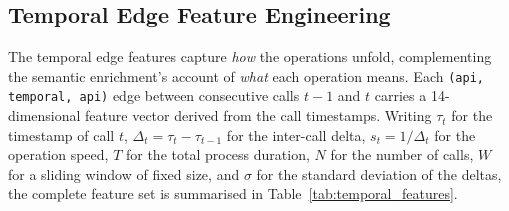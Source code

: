 \documentclass[%
    BCOR=10mm,
    DIV=13,
    toc=bibliography,
    toc=listof,
    oneside,
    12pt,
]{scrbook}
\begin{document}
\subsection{Temporal Edge Feature Engineering}
\label{subsec:temporal_features}

The temporal edge features capture \emph{how} the operations unfold,
complementing the semantic enrichment's account of \emph{what} each operation
means. Each \texttt{(api, temporal, api)} edge between consecutive calls $t-1$
and $t$ carries a 14-dimensional feature vector derived from the call
timestamps. Writing $\tau_t$ for the timestamp of call $t$, $\Delta_t = \tau_t -
\tau_{t-1}$ for the inter-call delta, $s_t = 1/\Delta_t$ for the operation
speed, $T$ for the total process duration, $N$ for the number of calls, $W$ for
a sliding window of fixed size, and $\sigma$ for the standard deviation of the
deltas, the complete feature set is summarised in
Table~\ref{tab:temporal_features}.
\end{document}
